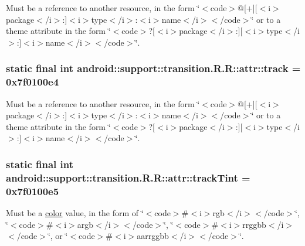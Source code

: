 Must be a reference to another resource, in the form \char`\"{}$<$code$>$@\mbox{[}+\mbox{]}\mbox{[}$<$i$>$package$<$/i$>$:\mbox{]}$<$i$>$type$<$/i$>$:$<$i$>$name$<$/i$>$$<$/code$>$\char`\"{} or to a theme attribute in the form \char`\"{}$<$code$>$?\mbox{[}$<$i$>$package$<$/i$>$:\mbox{]}\mbox{[}$<$i$>$type$<$/i$>$:\mbox{]}$<$i$>$name$<$/i$>$$<$/code$>$\char`\"{}. \hypertarget{classandroid_1_1support_1_1transition_1_1_r_1_1attr_ad6ec4a43cfe39ad618e8f367d0f9a66}{
\subsubsection[{track}]{\setlength{\rightskip}{0pt plus 5cm}static final int android::support::transition.R.R::attr::track = 0x7f0100e4}}
\label{classandroid_1_1support_1_1transition_1_1_r_1_1attr_ad6ec4a43cfe39ad618e8f367d0f9a66}


Must be a reference to another resource, in the form \char`\"{}$<$code$>$@\mbox{[}+\mbox{]}\mbox{[}$<$i$>$package$<$/i$>$:\mbox{]}$<$i$>$type$<$/i$>$:$<$i$>$name$<$/i$>$$<$/code$>$\char`\"{} or to a theme attribute in the form \char`\"{}$<$code$>$?\mbox{[}$<$i$>$package$<$/i$>$:\mbox{]}\mbox{[}$<$i$>$type$<$/i$>$:\mbox{]}$<$i$>$name$<$/i$>$$<$/code$>$\char`\"{}. \hypertarget{classandroid_1_1support_1_1transition_1_1_r_1_1attr_65527514caca5f94cdad9f3294fb0b52}{
\subsubsection[{trackTint}]{\setlength{\rightskip}{0pt plus 5cm}static final int android::support::transition.R.R::attr::trackTint = 0x7f0100e5}}
\label{classandroid_1_1support_1_1transition_1_1_r_1_1attr_65527514caca5f94cdad9f3294fb0b52}


Must be a \hyperlink{classandroid_1_1support_1_1transition_1_1_r_1_1color}{color} value, in the form of \char`\"{}$<$code$>$\#$<$i$>$rgb$<$/i$>$$<$/code$>$\char`\"{}, \char`\"{}$<$code$>$\#$<$i$>$argb$<$/i$>$$<$/code$>$\char`\"{}, \char`\"{}$<$code$>$\#$<$i$>$rrggbb$<$/i$>$$<$/code$>$\char`\"{}, or \char`\"{}$<$code$>$\#$<$i$>$aarrggbb$<$/i$>$$<$/code$>$\char`\"{}. 

